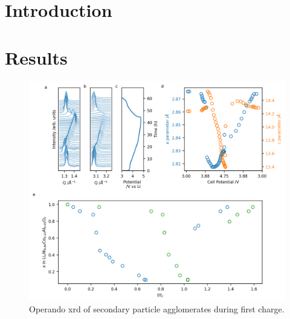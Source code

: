 \documentclass{article}
\begin{document}
\maketitle

\section{Introduction}

\blindtext

\section{Results}

\begin{figure}
  \includegraphics{figures/NCA_xrd.png}
  \caption{Operando \gls{xrd} of \nca{} secondary particle
    agglomerates during first charge. }
\end{figure}
\end{document}
